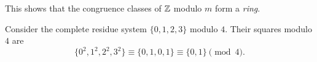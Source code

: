 \begin{remark}
  This shows that the congruence classes
  of $\mathbb{Z}$ modulo $m$ form a \emph{ring}.
\end{remark}

\begin{remark}
  Consider the complete residue system
  $\{0, 1, 2, 3\}$ modulo $4$. Their
  squares modulo $4$ are
  \[
    \{0^2, 1^2, 2^2, 3^2\}
    \equiv \{0, 1, 0, 1\}
    \equiv \{0, 1\} \pmod{4}.
  \]
\end{remark}
